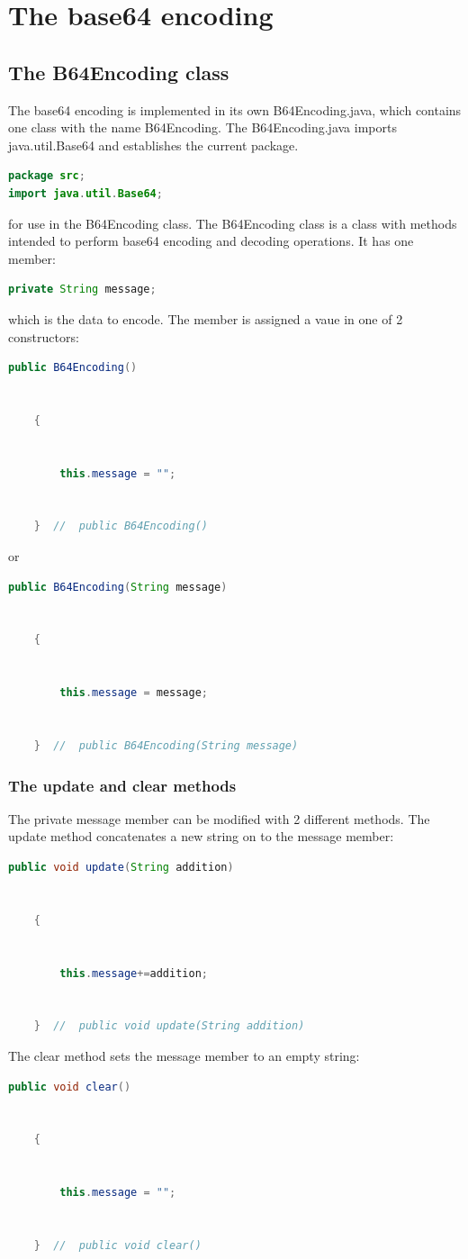 \documentclass[12pt, letterpaper]{report}
\begin{document}
\chapter{The base64 encoding} \label{chapter:2}
\section{The B64Encoding class}
The base64 encoding is implemented in its own B64Encoding.java, which contains one class with the name
B64Encoding. The B64Encoding.java imports java.util.Base64 and establishes the current package.
\begin{lstlisting}[breaklines=true, language=Java, label=code:2:1:0:1]
package src;
import java.util.Base64;
\end{lstlisting}
for use in the B64Encoding class.
The B64Encoding class is a class with methods intended to perform base64 encoding and decoding operations.
It has one member:
\begin{lstlisting}[breaklines=true, language=Java, label=code:2:1:0:2]
	private String message;
\end{lstlisting}
which is the data to encode. The member is assigned a vaue in one of 2 constructors:
\begin{lstlisting}[breaklines=true, language=Java, label=code:2:1:0:3]
	public B64Encoding()


	{


		this.message = "";


	}  //  public B64Encoding() 
\end{lstlisting}
or
\begin{lstlisting}[breaklines=true, language=Java, label=code:2:1:0:4]
	public B64Encoding(String message)


	{


		this.message = message;


	}  //  public B64Encoding(String message)
\end{lstlisting}
\subsection{The update and clear methods}
The private message member can be modified with 2 different methods.
The update method concatenates a new string on to the message member:
\begin{lstlisting}[breaklines=true, language=Java, label=code:2:1:1:1]
	public void update(String addition)


	{


		this.message+=addition;


	}  //  public void update(String addition)
\end{lstlisting}
The clear method sets the message member to an empty string:
\begin{lstlisting}[breaklines=true, language=Java, label=code:2:1:1:2]
	public void clear()


	{


		this.message = "";


	}  //  public void clear()
\end{lstlisting}
\end{document}
